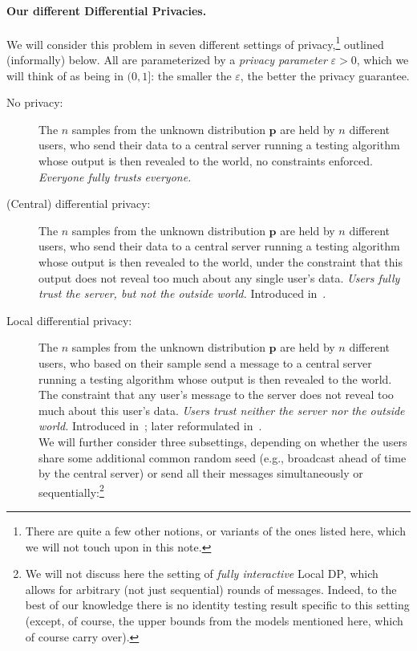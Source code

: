 \documentclass[10pt]{article}
\newcommand{\ns}{n}
\newcommand{\p}{\mathbf{p}}
\newcommand{\priv}{\varepsilon}
\begin{document}
\paragraph{Our different Differential Privacies.} We will consider this problem in seven different settings of privacy,\footnote{There are quite a few other notions, or variants of the ones listed here, which we will not touch upon in this note.} outlined (informally) below. All are parameterized by a \emph{privacy parameter} $\priv>0$, which we will think of as being in $(0,1]$: the smaller the $\priv$, the better the privacy guarantee.
\begin{description}
  \item[No privacy:] The $\ns$ samples from the unknown distribution $\p$ are held by $\ns$ different users, who send their data to a central server running a testing algorithm whose output is then revealed to the world, no constraints enforced. \emph{Everyone fully trusts everyone.}
  \item[(Central) differential privacy:] The $\ns$ samples from the unknown distribution $\p$ are held by $\ns$ different users, who send their data to a central server running a testing algorithm whose output is then revealed to the world, under the constraint that this output does not reveal too much about any single user's data. \emph{Users fully trust the server, but not the outside world.} Introduced in~\cite{DworkMNS06}.
  \item[Local differential privacy:] The $\ns$ samples from the unknown distribution $\p$ are held by $\ns$ different users, who based on their sample send a message to a central server running a testing algorithm whose output is then revealed to the world. The constraint that any user's message to the server does not reveal too much about this user's data. \emph{Users trust neither the server nor the outside world.} Introduced in~\cite{KasiviswanathanLNRS11}; later reformulated in~\cite{DuchiJW13}.\\
    We will further consider three subsettings, depending on whether the users share some additional common random seed (e.g., broadcast ahead of time by the central server) or send all their messages simultaneously or sequentially:\footnote{We will not discuss here the setting of \emph{fully interactive} Local DP, which allows for arbitrary (not just sequential) rounds of messages. Indeed, to the best of our knowledge there is no identity testing result specific to this setting (except, of course, the upper bounds from the models mentioned here, which of course carry over).}

\end{description}
\end{document}
